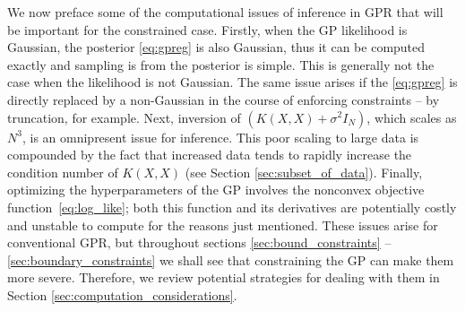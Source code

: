 We now preface some of the computational issues of inference in GPR that will be important for the constrained case. Firstly, when the GP likelihood is Gaussian, the posterior \eqref{eq:gpreg} is also Gaussian, thus it can be computed exactly and sampling is from the posterior is simple. This is generally not the case when the likelihood is not Gaussian. The same issue arises if the  \eqref{eq:gpreg} is directly replaced by a non-Gaussian  in the course of enforcing constraints -- by truncation, for example. Next, inversion of $(K(X,X)+\sigma^2 I_N)$, which scales as $N^3$, is an omnipresent issue for inference. This poor scaling to large data is compounded by the fact that increased data tends to rapidly increase the condition number of $K(X,X)$ (see Section \ref{sec:subset_of_data}). Finally, optimizing the hyperparameters of the GP involves the nonconvex  objective function~\eqref{eq:log_like}; both this function and its derivatives are potentially costly and unstable to compute for the reasons just mentioned. These issues arise for conventional GPR, but throughout sections \ref{sec:bound_constraints} -- \ref{sec:boundary_constraints} we shall see that constraining the GP can make them more severe. Therefore, we review potential strategies for dealing with them in Section \ref{sec:computation_considerations}.

